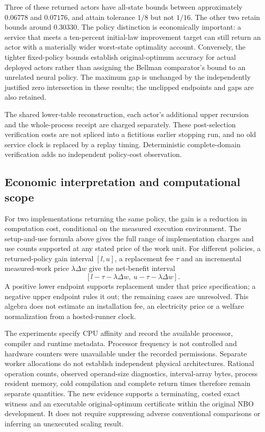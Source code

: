 

Three of these returned actors have all-state bounds between approximately $0.06778$ and $0.07176$, and attain tolerance $1/8$ but not $1/16$. The other two retain bounds around $0.30330$. The policy distinction is economically important: a service that meets a ten-percent initial-law improvement target can still return an actor with a materially wider worst-state optimality account. Conversely, the tighter fixed-policy bounds establish original-optimum accuracy for actual deployed actors rather than assigning the Bellman comparator's bound to an unrelated neural policy. The maximum gap is unchanged by the independently justified zero intersection in these results; the unclipped endpoints and gaps are also retained.

The shared lower-table reconstruction, each actor's additional upper recursion and the whole-process receipt are charged separately. These post-selection verification costs are not spliced into a fictitious earlier stopping run, and no old service clock is replaced by a replay timing. Deterministic complete-domain verification adds no independent policy-cost observation.

\subsection{Economic interpretation and computational scope}
For two implementations returning the same policy, the gain is a reduction in computation cost, conditional on the measured execution environment. The setup-and-use formula above gives the full range of implementation charges and use counts supported at any stated price of the work unit. For different policies, a returned-policy gain interval $[l,u]$, a replacement fee $\tau$ and an incremental measured-work price $\lambda\Delta w$ give the net-benefit interval
\[
 [l-\tau-\lambda\Delta w,\ u-\tau-\lambda\Delta w].
\]
A positive lower endpoint supports replacement under that price specification; a negative upper endpoint rules it out; the remaining cases are unresolved. This algebra does not estimate an installation fee, an electricity price or a welfare normalization from a hosted-runner clock.

The experiments specify CPU affinity and record the available processor, compiler and runtime metadata. Processor frequency is not controlled and hardware counters were unavailable under the recorded permissions. Separate worker allocations do not establish independent physical architectures. Rational operation counts, observed operand-size diagnostics, interval-array bytes, process resident memory, cold compilation and complete return times therefore remain separate quantities. The new evidence supports a terminating, costed exact witness and an executable original-optimum certificate within the original NBO development. It does not require suppressing adverse conventional comparisons or inferring an unexecuted scaling result.
